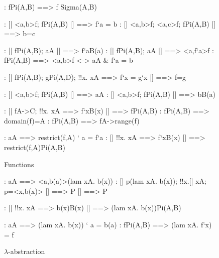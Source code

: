 \begin{figure}
\begin{alltt*}\isastyleminor
{}:     f\isasymin{}Pi(A,B) ==> f \isasymsubseteq Sigma(A,B)

:  [| <a,b>\isasymin{}f; f\isasymin{}Pi(A,B) |] ==> f`a = b
: [| <a,b>\isasymin{}f; <a,c>\isasymin{}f; f\isasymin{}Pi(A,B) |] ==> b=c

:     [| f\isasymin{}Pi(A,B); a\isasymin{}A |] ==> f`a\isasymin{}B(a)
:     [| f\isasymin{}Pi(A,B); a\isasymin{}A |] ==> <a,f`a>\isasymin{}f
:      f\isasymin{}Pi(A,B) ==> <a,b>\isasymin{}f <-> a\isasymin{}A & f`a = b

:  [| f\isasymin{}Pi(A,B); g\isasymin{}Pi(A,D);
                   !!x. x\isasymin{}A ==> f`x = g`x     |] ==> f=g

:    [| <a,b>\isasymin{}f; f\isasymin{}Pi(A,B) |] ==> a\isasymin{}A
:     [| <a,b>\isasymin{}f; f\isasymin{}Pi(A,B) |] ==> b\isasymin{}B(a)

:        [| f\isasymin{}A->C; !!x. x\isasymin{}A ==> f`x\isasymin{}B(x) |] ==> f\isasymin{}Pi(A,B)
:  f\isasymin{}Pi(A,B) ==> domain(f)=A
:   f\isasymin{}Pi(A,B) ==> f\isasymin{}A->range(f)

:       a\isasymin{}A ==> restrict(f,A) ` a = f`a
:  [| !!x. x\isasymin{}A ==> f`x\isasymin{}B(x) |] ==> 
                restrict(f,A)\isasymin{}Pi(A,B)
\end{alltt*}
\caption{Functions} \label{zf-func1}
\end{figure}


\begin{figure}
\begin{alltt*}\isastyleminor
{}:     a\isasymin{}A ==> <a,b(a)>\isasymin{}(lam x\isasymin{}A. b(x))
:     [| p\isasymin{}(lam x\isasymin{}A. b(x)); !!x.[| x\isasymin{}A; p=<x,b(x)> |] ==> P 
          |] ==>  P

: [| !!x. x\isasymin{}A ==> b(x)\isasymin{}B(x) |] ==> (lam x\isasymin{}A. b(x))\isasymin{}Pi(A,B)

:     a\isasymin{}A ==> (lam x\isasymin{}A. b(x)) ` a = b(a)
:      f\isasymin{}Pi(A,B) ==> (lam x\isasymin{}A. f`x) = f
\end{alltt*}
\caption{$\lambda$-abstraction} \label{zf-lam}
\end{figure}


